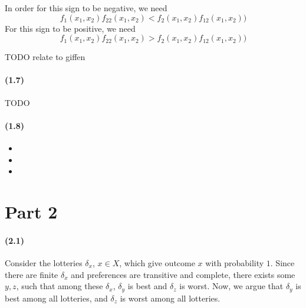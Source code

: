 \documentclass[10pt,letter]{article}
\begin{document}
In order for this sign to be negative, we need
\[ f_1(x_1, x_2)f_{22}(x_1, x_2) < f_2(x_1, x_2)f_{12}(x_1, x_2)) \]
For this sign to be positive, we need
\[ f_1(x_1, x_2)f_{22}(x_1, x_2) > f_2(x_1, x_2)f_{12}(x_1, x_2)) \]

TODO relate to giffen
\paragraph{(1.7)}
TODO
\paragraph{(1.8)}
\begin{itemize}
\item
\item
\item
\end{itemize}
\pagebreak
\section*{Part 2}
\paragraph{(2.1)}
Consider the lotteries $\delta_x$, $x \in X$, which give outcome $x$ with probability $1$. Since there are finite $\delta_x$ and preferences are transitive and complete, there exists some $y,z$, such that among these $\delta_x$, $\delta_y$ is best and $\delta_z$ is worst. Now, we argue that $\delta_y$ is best among all lotteries, and $\delta_z$ is worst among all lotteries.
\end{document}
